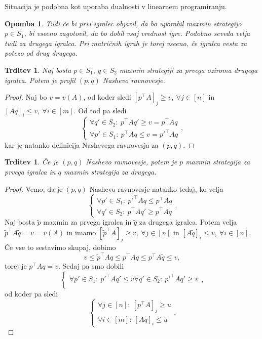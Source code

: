 \documentclass[10pt, a4paper]{article}
\newtheorem{trditev}[izr]{Trditev}
\newtheorem*{opomba}{Opomba}
\newenvironment{noticeC}{%
  \tcolorbox[%
  notitle,
  empty,
  enhanced,  %
  breakable,
  coltext=black, 
  fontupper=\rmfamily,
  parbox=false,
  noparskip,
  sharp corners,
  boxrule=-1pt,  %
  frame hidden,
  left=7pt,  %
  right=7pt,
  top=5pt,
  bottom=5pt,
  before skip=2.5ex plus 2pt,
  after skip=2.5ex plus 2pt,
  overlay unbroken and last={%
  },
  ]}
{\endtcolorbox}
\newenvironment{dokaz}%
  {\begin{noticeC}\begin{proof}}%
  {\end{proof}\end{noticeC}}
\begin{document}
Situacija je podobna kot uporaba dualnosti v linearnem programiranju.

\begin{opomba}
  Tudi če bi prvi igralec objavil, da bo uporabil maxmin strategijo $p \in S_1$,
  bi vseeno zagotovil, da bo dobil vsaj vrednost igre. Podobno seveda velja tudi za drugega igralca.
  Pri matričnih igrah je torej vseeno, če igralca vesta za potezo od drug drugega.
\end{opomba}

\begin{trditev}
  Naj bosta $p \in S_1,\ q \in S_2$ maxmin strategiji za prvega oziroma drugega igralca.
  Potem je profil $(p, q)$ Nashevo ravnovesje. 
\end{trditev}

\begin{dokaz}
  Naj bo $v = v(A)$, od koder sledi $[p^\top A]_j \geq v,\ \forall j \in [n]$ in 
  $[Aq]_i \leq v,\ \forall i \in [m]$. Od tod pa sledi
  $$\begin{cases}
    \forall q' \in S_2:\ p^\top Aq' \geq v = p^\top A q\\
    \forall p' \in S_1:\ p^\top Aq \leq v = p'^\top A q
  \end{cases},$$
  kar je natanko definicija Nashevega ravnovesja za $(p, q)$.
\end{dokaz}

\begin{trditev}
  Če je $(p, q)$ Nashevo ravnovesje, potem je $p$ maxmin strategija za prvega igralca in $q$ maxmin strategija za drugega.
\end{trditev}

\begin{dokaz}
  Vemo, da je $(p, q)$ Nashevo ravnovesje natanko tedaj, ko velja 
  $$\begin{cases}
    \forall p' \in S_1:\ p'^\top Aq \leq p^\top A q\\
    \forall q' \in S_2:\ p^\top Aq' \geq p^\top A q
  \end{cases}.$$
  Naj bosta $\widetilde{p}$ maxmin za prvega igralca in $\widetilde{q}$
  za drugega igralca. Potem velja $\widetilde{p}^\top A \widetilde{q} = v = v(A)$ in imamo 
  $[\widetilde{p}^\top A]_j \geq v,\ \forall j \in [n]$ in $[A \widetilde{q}]_i \leq v,\ \forall i \in [n]$.
  Če vse to sestavimo skupaj, dobimo 
  $$v \leq \widetilde{p}^\top A q \leq p^\top A q \leq p^\top A \widetilde{q} \leq v,$$
  torej je $p^\top A q = v.$ Sedaj pa smo dobili 
  $$\begin{cases}
    \forall p' \in S_1:\ p'^\top Aq' \leq v
    \forall q' \in S_2:\ p'^\top Aq' \geq v\\
  \end{cases},$$
  od koder pa sledi 
  $$\begin{cases}
    \forall j \in [n]:\ [p^\top A]_j \geq u\\
    \forall i \in [m]:\ [Aq]_i \leq u
  \end{cases}.$$
\end{dokaz}
\end{document}
